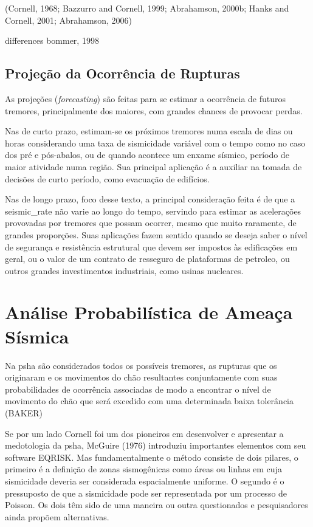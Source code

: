 (Cornell, 1968;  Bazzurro and Cornell, 1999; Abrahamson, 2000b; Hanks and Cornell, 2001; Abrahamson, 2006) 

differences bommer, 1998
 
\subsection{Projeção da Ocorrência de Rupturas}
\label{sec:projecao}

As projeções (\textit{forecasting}) são feitas para se estimar a ocorrência de futuros tremores,
principalmente dos maiores, com grandes chances de provocar perdas.

Nas de curto prazo, estimam-se os próximos tremores
numa escala de dias ou horas considerando uma taxa de sismicidade variável 
com o tempo como no caso dos pré e pós-abalos, ou de quando 
acontece um enxame sísmico, período de maior atividade numa região.
Sua principal aplicação é a auxiliar na tomada de decisões de curto período, 
como evacuação de edifícios.

Nas de longo prazo, foco desse texto, a principal consideração feita é de que a 
\gls{seismic_rate} não varie ao longo do tempo, servindo para estimar as acelerações 
provovadas por tremores que possam ocorrer,
mesmo que muito raramente, de grandes proporções. Suas aplicações fazem sentido quando
se deseja saber o nível de segurança e resistência estrutural que devem ser impostos 
às edificações em geral, ou o valor de um contrato de resseguro de plataformas de petroleo,
ou outros grandes investimentos industriais, como usinas nucleares.


\section{Análise Probabilística de Ameaça Sísmica}
\label{sec:psha}

Na \gls{psha} são considerados todos os possíveis tremores, as rupturas que os originaram e os movimentos do chão
resultantes conjuntamente com suas probabilidades de ocorrência associadas de modo a encontrar o nível de movimento do
chão que será excedido com uma determinada baixa tolerância (BAKER)

Se por um lado Cornell foi um dos pioneiros em desenvolver e apresentar a medotologia da \gls{psha}, McGuire (1976)
introduziu importantes elementos com seu software EQRISK. Mas fundamentalmente o método consiste de dois pilares, o
primeiro é a definição de zonas sismogênicas como áreas ou linhas em cuja sismicidade deveria ser considerada
espacialmente uniforme. O segundo é o pressuposto de que a sismicidade pode ser representada por um processo de Poisson.
Os dois têm sido de uma maneira ou outra questionados e pesquisadores ainda propõem alternativas.

